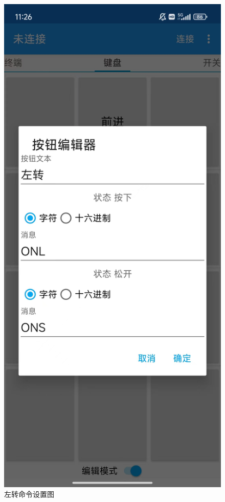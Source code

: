 \begin{figure}[htbp]
	\begin{minipage}{0.49\linewidth}
		\centering
		\includegraphics[width=0.6\linewidth]{figures/左转命令设置.jpg}
		\caption{左转命令设置图}
		\label{左转命令设置}%
	\end{minipage}
	\begin{minipage}{0.49\linewidth}
		\centering

\end{minipage}
\end{figure}
